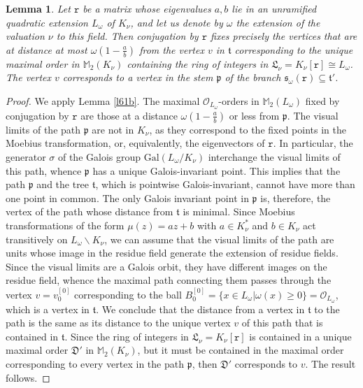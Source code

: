 \documentclass{article}
\newtheorem{Lem}[Prop]{Lemma}
\theoremstyle{definition}
\theoremstyle{remark}
\begin{document}
\begin{Lem}\label{l61c}
     Let $\mathtt{r}$ be a matrix whose eigenvalues $a,b$
     lie in an unramified quadratic extension 
     $L_\omega$ of $K_\nu$,
     and let us denote by $\omega$ the extension 
     of the valuation
     $\nu$ to this field. Then conjugation by $\mathtt{r}$
    fixes precisely the vertices that are at distance at most 
    $\omega\left(1-\frac ab\right)$ from the vertex $v$ 
    in $\mathfrak{t}$ corresponding
    to the unique maximal order in
    $\mathbb{M}_2(K_\nu)$ containing the ring 
    of integers in 
    $\mathfrak{L}_\nu=K_\nu[\mathtt{r}]\cong L_\omega$. 
    The vertex $v$ corresponds to
    a vertex in the stem $\mathfrak{p}$ of the branch
    $\mathfrak{s}_\omega(\mathtt{r})\subseteq \mathfrak{t}'$.
\end{Lem}

\begin{proof}
     We apply Lemma \ref{l61b}. The maximal 
     $\mathcal{O}_{L_\omega}$-orders
     in $\mathbb{M}_2(L_\omega)$ fixed by conjugation by
     $\mathtt{r}$ are those at a distance 
     $\omega\left(1-\frac ab\right)$ or less from 
     $\mathfrak{p}$. The visual limits of
     the path $\mathfrak{p}$ are not in 
     $K_\nu$, as they correspond to the fixed points
     in the Moebius transformation, or, equivalently, the 
     eigenvectors of $\mathtt{r}$. In particular, the 
     generator $\sigma$ of the Galois group 
    $\mathrm{Gal}(L_\omega/K_\nu)$ interchange the visual 
    limits of this path, whence $\mathfrak{p}$ has a unique 
    Galois-invariant point. This implies that the path
    $\mathfrak{p}$ and the tree $\mathfrak{t}$, which is 
    pointwise Galois-invariant, cannot have more than one 
    point in common. The only Galois invariant point
    in $\mathfrak{p}$ is, therefore, the vertex of the 
    path whose distance from $\mathfrak{t}$ is minimal.
    Since Moebius transformations of the form $\mu(z)=az+b$
    with $a\in K_\nu^*$ and $b\in K_\nu$ act transitively on
    $L_\omega\smallsetminus K_\nu$, we can assume that the
    visual limits of the path are units whose image
    in the residue field generate the extension of 
    residue fields. Since the visual limits are a Galois
    orbit, they have different images on the residue field, 
    whence the maximal path connecting them passes through
    the vertex $v=v_0^{[0]}$ corresponding to the ball
    $B_0^{[0]}=
    \{x\in L_\omega|\omega(x)\geq0\}=\mathcal{O}_{L_\omega}$, 
    which is a vertex in $\mathfrak{t}$.
    We conclude that the distance from a vertex
    in $\mathfrak{t}$ to the path is the same as its distance
    to the unique vertex $v$ of this path that is contained
    in $\mathfrak{t}$. Since the ring 
    of integers in 
    $\mathfrak{L}_\nu=K_\nu[\mathtt{r}]$ is contained
    in a unique maximal order $\mathfrak{D}'$ in 
    $\mathbb{M}_2(K_\nu)$, but
    it must be contained in the maximal order 
    corresponding to every 
    vertex in the path $\mathfrak{p}$, 
    then $\mathfrak{D}'$ corresponds to $v$.
    The result follows. 
\end{proof}
\end{document}
